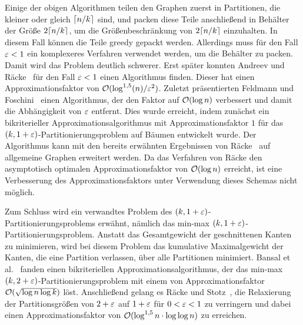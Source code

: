 Einige der obigen Algorithmen teilen den Graphen zuerst in Partitionen, die kleiner oder gleich $\lceil n/k\rceil$ sind, und packen diese Teile anschließend in Behälter der Größe $2 \lceil n/k\rceil$, um die Größenbeschränkung von $2 \lceil n/k\rceil$ einzuhalten.
In diesem Fall können die Teile greedy gepackt werden.
Allerdings muss für den Fall $\varepsilon < 1$ ein komplexeres Verfahren verwendet werden, um die Behälter zu packen. 
Damit wird das Problem deutlich schwerer.
Erst später konnten Andreev und Räcke~\cite{ar06} für den Fall $\varepsilon < 1$ einen Algorithmus finden.
Dieser hat einen Approximationsfaktor von $\mathcal{O}(\log^{1,5}(n)/\varepsilon^2)$.
Zuletzt präsentierten Feldmann und Foschini~\cite{FF15} einen Algorithmus, der den Faktor auf $\mathcal{O}(\log n)$ verbessert und damit die Abhängigkeit von $\varepsilon$ entfernt.
Dies wurde erreicht, indem zunächst ein bikriterieller Approximationsalgorithmus mit Approximationsfaktor $1$ für das $(k,1+\varepsilon)$\hyp Partitionierungsproblem auf Bäumen entwickelt wurde.
Der Algorithmus kann mit den bereits erwähnten Ergebnissen von Räcke~\cite{rc08} auf allgemeine Graphen erweitert werden.
Da das Verfahren von Räcke den asymptotisch optimalen Approximationsfaktor von $\mathcal{O}(\log n)$ erreicht, ist eine Verbesserung des Approximationsfaktors unter Verwendung dieses Schemas nicht möglich.

Zum Schluss wird ein verwandtes Problem des $(k, 1+\varepsilon)$\hyp Partitionierungsproblems erwähnt, nämlich das min-max $(k, 1+\varepsilon)$\hyp Partitionierungsproblem.
Anstatt das Gesamtgewicht der geschnittenen Kanten zu minimieren, wird bei diesem Problem das kumulative Maximalgewicht der Kanten, die eine Partition verlassen, über alle Partitionen minimiert.
Bansal et al.~\cite{BFK+11} fanden einen bikriteriellen Approximationsalgorithmus, der das min-max $(k, 2 + \varepsilon)$\hyp Partitionierungsproblem mit einem von Approximationsfaktor $\mathcal{O}(\sqrt{\log n \log k})$ löst.
Anschließend gelang es Räcke und Stotz~\cite{RS16}, die Relaxierung der Partitionsgrößen von $2 + \varepsilon$ auf $1 + \varepsilon$ für $0 < \varepsilon < 1$ zu verringern und dabei einen Approximationsfaktor von $\mathcal{O}(\log^{1,5} n \cdot \log \log n)$ zu erreichen.

